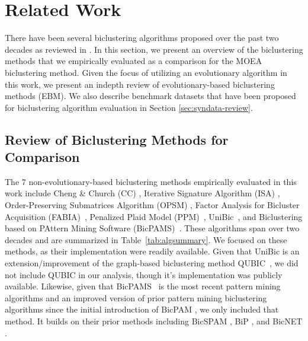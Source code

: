 \section{Related Work}




There have been several biclustering algorithms proposed over the past two decades as reviewed in  \cite{prelic2006systematic,eren2012comparative,oghabian2014biclustering,pontes2015biclustering,roy2016analysis}.%
In this section, we present an overview of the biclustering methods that we empirically evaluated as a comparison for the MOEA biclustering method. Given the focus of utilizing an evolutionary algorithm in this work, we present an indepth review of evolutionary-based biclustering methods (EBM).
We also describe benchmark datasets that have been proposed for biclustering algorithm evaluation in Section \ref{sec:syndata-review}.

\subsection{Review of Biclustering Methods for Comparison}
\label{sec:review-methods}

The 7 non-evolutionary-based biclustering methods empirically evaluated in this work include Cheng \& Church (CC) \cite{cheng2000biclustering}, Iterative Signature Algorithm (ISA) \cite{bergmann2003iterative}, Order-Preserving Submatrices Algorithm (OPSM) \cite{ben2003discovering}, Factor Analysis for Bicluster Acquisition (FABIA)~\cite{hochreiter2010fabia}, Penalized Plaid Model (PPM)~\cite{chekouo2015thepenalized}, UniBic~\cite{wang2016unibic}, and Biclustering based on PAttern Mining Software (BicPAMS)~\cite{henriques2017bicpams}.
These algorithms span over two decades and are summarized in Table~\ref{tab:algsummary}. We focused on these methods, as their implementation were readily available. 
Given that UniBic is an extension/improvement of the graph-based biclustering method QUBIC~\cite{li2009qubic}, we did not include QUBIC in our analysis, though it's implementation was publicly available. Likewise, given that BicPAMS~\cite{henriques2017bicpams} is the most recent pattern mining algorithms and an improved version of prior pattern mining biclustering algorithms since the initial introduction of BicPAM \cite{henriques2014bicpam}, we only included that method. 
It builds on their prior methods including BicSPAM \cite{henriques2014bicspam}, BiP \cite{henriques2015biclustering}, and BicNET \cite{henriques2016bicnet}.

